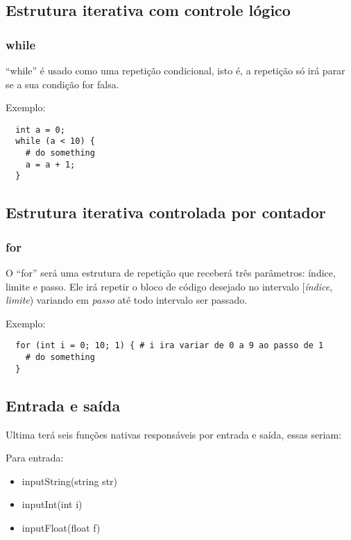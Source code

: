 \documentclass[a4paper, 11pt, article]{memoir}
\begin{document}
\subsection{Estrutura iterativa com controle lógico}
\label{subsec:iterativalogico}

\subsubsection{while}
\label{subsubsec:while}
``while'' é usado como uma repetição condicional, isto é, a repetição só irá
parar se a sua condição for falsa.

Exemplo:
\begin{lstlisting}
  int a = 0;
  while (a < 10) {
    # do something
    a = a + 1;
  }
\end{lstlisting}

\subsection{Estrutura iterativa controlada por contador}
\label{subsec:iterativacontador}

\subsubsection{for}
\label{subsubsec:for}
O ``for'' será uma estrutura de repetição que receberá três parâmetros: índice,
limite e passo. Ele irá repetir o bloco de código desejado no intervalo
[\emph{índice}, \emph{limite}) variando em \emph{passo} até todo intervalo
ser passado.

Exemplo:
\begin{lstlisting}
  for (int i = 0; 10; 1) { # i ira variar de 0 a 9 ao passo de 1
    # do something
  }
\end{lstlisting}

\subsection{Entrada e saída}
\label{subsec:io}
Ultima terá seis funções nativas responsáveis por entrada e saída, essas seriam:

Para entrada:
\begin{itemize}
\item inputString(string str)
\item inputInt(int i)
\item inputFloat(float f)
\end{itemize}
\end{document}

